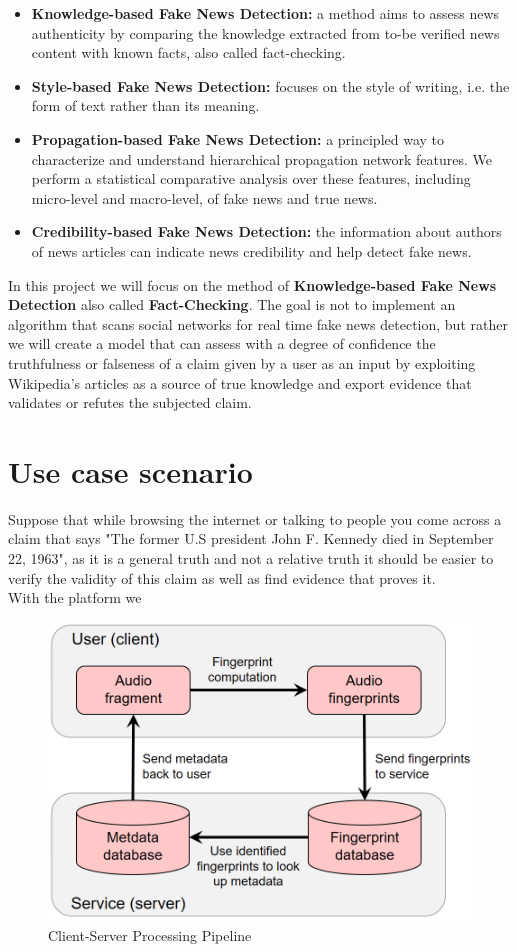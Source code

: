 \documentclass[10pt, english]{report}
\begin{document}
\begin{itemize}
\item \textbf{Knowledge-based Fake News Detection:} a method aims to assess news authenticity by comparing the knowledge extracted from to-be verified news content with known facts, also called fact-checking.
\item \textbf{Style-based Fake News Detection:} focuses on the style of writing, i.e. the form of text rather than its meaning.
\item \textbf{Propagation-based Fake News Detection:} a principled way to characterize and understand hierarchical propagation network features. We perform a statistical comparative analysis over these features, including micro-level and macro-level, of fake news and true news.
\item \textbf{Credibility-based Fake News Detection:} the information about authors of news articles can indicate news credibility and help detect fake news.
\end{itemize}

In this project we will focus on the method of \textbf{Knowledge-based Fake News Detection} also called \textbf{Fact-Checking}. The goal is not to implement an algorithm that scans social networks for real time fake news detection, but rather we will create a model that can assess with a degree of confidence the truthfulness or falseness of a claim given by a user as an input by exploiting Wikipedia's articles as a source of true knowledge and export evidence that validates or refutes the subjected claim.

\section{Use case scenario}
Suppose that while browsing the internet or talking to people you come across a claim that says "The former U.S president John F. Kennedy died in September 22, 1963", as it is a general truth and not a relative truth it should be easier to verify the validity of this claim as well as find evidence that proves it.\\
With the platform we 

\begin{figure}[H]
	\centering
	\includegraphics[scale=0.3]{img/general_schema.png}
	\caption{Client-Server Processing Pipeline}
\end{figure}
\end{document}
